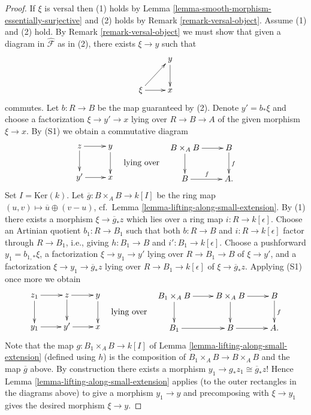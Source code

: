 \begin{proof}
If $\xi$ is versal then (1) holds by
Lemma \ref{lemma-smooth-morphism-essentially-surjective}
and (2) holds by
Remark \ref{remark-versal-object}.
Assume (1) and (2) hold. By
Remark \ref{remark-versal-object}
we must show that given a diagram in $\widehat{\mathcal{F}}$ as in (2),
there exists $\xi \to y$ such that
$$
\xymatrix{
            &  y \ar[d] \\
\xi \ar[ur] \ar[r]  &  x
}
$$
commutes. Let $b : R \to B$ be the map guaranteed by (2). Denote
$y' = b_*\xi$ and choose a factorization $\xi \to y' \to x$
lying over $R \to B \to A$ of the given morphism $\xi \to x$.
By (S1) we obtain a commutative diagram
$$
\vcenter{
\xymatrix{
z  \ar[r] \ar[d]          &  y \ar[d] \\
y' \ar[r]  &  x
}
}
\quad\text{lying over}\quad
\vcenter{
\xymatrix{
B \times_A B \ar[d] \ar[r] &   B  \ar[d]^{f} \\
B \ar[r]^{f} &   A .
}
}
$$
Set $I = \text{Ker}(k)$. Let $\overline{g} : B \times_A B \to k[I]$
be the ring map $(u, v) \mapsto \overline{u} \oplus (v - u)$,
cf.\ Lemma \ref{lemma-lifting-along-small-extension}.
By (1) there exists a morphism $\xi \to \overline{g}_*z$ which lies over a ring
map $i : R \to k[\epsilon]$. Choose an Artinian quotient
$b_1 : R \to B_1$ such that both $b : R \to B$ and $i : R \to k[\epsilon]$
factor through $R \to B_1$, i.e., giving
$h : B_1 \to B$ and $i' : B_1 \to k[\epsilon]$.
Choose a pushforward $y_1 = b_{1, *}\xi$, a factorization
$\xi \to y_1 \to y'$ lying over $R \to B_1 \to B$ of $\xi \to y'$, and a
factorization $\xi \to y_1 \to \overline{g}_*z$ lying over
$R \to B_1 \to k[\epsilon]$ of $\xi \to \overline{g}_*z$.
Applying (S1) once more we obtain
$$
\vcenter{
\xymatrix{
z_1  \ar[r] \ar[d] & z \ar[r] \ar[d] & y \ar[d] \\
y_1 \ar[r] & y' \ar[r] &  x
}
}
\quad\text{lying over}\quad
\vcenter{
\xymatrix{
B_1 \times_A B \ar[d] \ar[r] & B \times_A B \ar[r] \ar[d] & B \ar[d]^{f} \\
B_1 \ar[r]  & B \ar[r] &  A .
}
}
$$
Note that the map $g : B_1 \times_A B \to k[I]$ of
Lemma \ref{lemma-lifting-along-small-extension}
(defined using $h$)
is the composition of $B_1 \times_A B \to B \times_A B$ and the map
$\overline{g}$ above. By construction there exists a morphism
$y_1 \to g_*z_1 \cong \overline{g}_*z$! Hence
Lemma \ref{lemma-lifting-along-small-extension}
applies (to the outer rectangles in the diagrams above)
to give a morphism $y_1 \to y$ and precomposing
with $\xi \to y_1$ gives the desired morphism $\xi \to y$.
\end{proof}

